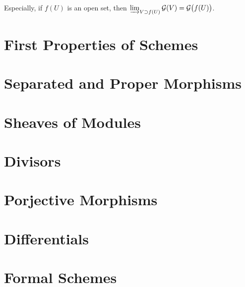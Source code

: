 \documentclass[12pt]{extbook}
\begin{document}
Especially, if $f(U)$ is an open set, then $\varinjlim_{V \supset f(U)}\mathcal{G}(V)=\mathcal{G}\bigl(f(U)\bigr)$.

\section{First Properties of Schemes}
\section{Separated and Proper Morphisms}
\section{Sheaves of Modules}
\section{Divisors}
\section{Porjective Morphisms}
\section{Differentials}
\section{Formal Schemes}
\end{document}
